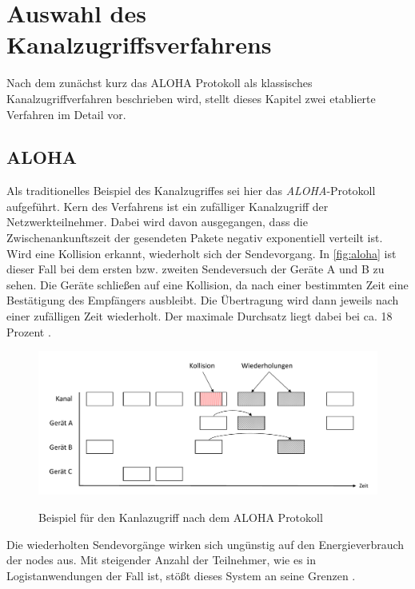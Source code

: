 \chapter{Auswahl des Kanalzugriffsverfahrens}\label{kap:zugriffsverfahren}

Nach dem zunächst kurz das ALOHA Protokoll als klassisches Kanalzugriffverfahren beschrieben wird, stellt dieses Kapitel zwei etablierte Verfahren im Detail vor.

\section{ALOHA}\label{kap:zugriffsverfahren_sec:aloha}
Als traditionelles Beispiel des Kanalzugriffes sei hier das \emph{ALOHA}-Protokoll aufgeführt. Kern des Verfahrens ist ein zufälliger Kanalzugriff der Netzwerkteilnehmer. Dabei wird davon ausgegangen, dass die Zwischenankunftszeit der gesendeten Pakete negativ exponentiell verteilt ist. Wird eine Kollision erkannt, wiederholt sich der Sendevorgang. In \autoref{fig:aloha} ist dieser Fall bei dem ersten bzw. zweiten Sendeversuch der Geräte A und B zu sehen. Die Geräte schließen auf eine Kollision, da nach einer bestimmten Zeit eine Bestätigung des Empfängers ausbleibt. Die Übertragung wird dann jeweils nach einer zufälligen Zeit wiederholt. Der maximale Durchsatz liegt dabei bei ca. 18 Prozent \citep{aloha}. 

\begin{figure}[bth]
        \myfloatalign
        {\includegraphics[width=1\linewidth]{gfx/ALOHA}} 
        \caption[ALOHA]{Beispiel für den Kanlazugriff nach dem ALOHA Protokoll }\label{fig:aloha}
\end{figure}

Die wiederholten Sendevorgänge wirken sich ungünstig auf den Energieverbrauch der \glspl{node} aus. Mit steigender Anzahl der Teilnehmer, wie es in Logistanwendungen der Fall ist, stößt dieses System an seine Grenzen \citep{inBinTestbed}. 

